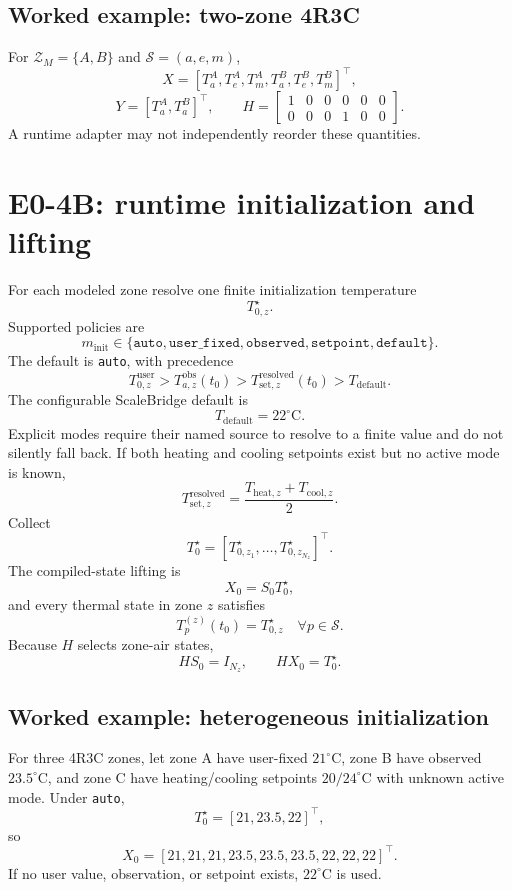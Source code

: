 \documentclass[11pt]{article}
\newcommand{\Zset}{\mathcal{Z}_M}
\begin{document}
\subsection*{Worked example: two-zone 4R3C}
For \(\Zset=\{A,B\}\) and \(\mathcal S=(a,e,m)\),
\[
X=[T_a^A,T_e^A,T_m^A,T_a^B,T_e^B,T_m^B]^\top,
\]
\[
Y=[T_a^A,T_a^B]^\top,\qquad
H=\begin{bmatrix}1&0&0&0&0&0\\0&0&0&1&0&0\end{bmatrix}.
\]
A runtime adapter may not independently reorder these quantities.

\section{E0-4B: runtime initialization and lifting}
For each modeled zone resolve one finite initialization temperature
\[
\boxed{T_{0,z}^{\star}}.
\]
Supported policies are
\[
\boxed{m_{\mathrm{init}}\in\{\texttt{auto},\texttt{user\_fixed},\texttt{observed},\texttt{setpoint},\texttt{default}\}}.
\]
The default is \texttt{auto}, with precedence
\[
\boxed{T_{0,z}^{\mathrm{user}}>T_{a,z}^{\mathrm{obs}}(t_0)>T_{\mathrm{set},z}^{\mathrm{resolved}}(t_0)>T_{\mathrm{default}}}.
\]
The configurable ScaleBridge default is
\[
\boxed{T_{\mathrm{default}}=22^\circ\mathrm C}.
\]
Explicit modes require their named source to resolve to a finite value and do not silently
fall back. If both heating and cooling setpoints exist but no active mode is known,
\[
\boxed{T_{\mathrm{set},z}^{\mathrm{resolved}}=\frac{T_{\mathrm{heat},z}+T_{\mathrm{cool},z}}{2}}.
\]
Collect
\[
T_0^\star=[T_{0,z_1}^{\star},\ldots,T_{0,z_{N_z}}^{\star}]^\top.
\]
The compiled-state lifting is
\[
\boxed{X_0=S_0T_0^\star},
\]
and every thermal state in zone \(z\) satisfies
\[
\boxed{T_p^{(z)}(t_0)=T_{0,z}^{\star}\quad\forall p\in\mathcal S}.
\]
Because \(H\) selects zone-air states,
\[
\boxed{HS_0=I_{N_z}},\qquad
\boxed{HX_0=T_0^\star}.
\]

\subsection*{Worked example: heterogeneous initialization}
For three 4R3C zones, let zone A have user-fixed \(21^\circ\mathrm C\), zone B have observed
\(23.5^\circ\mathrm C\), and zone C have heating/cooling setpoints \(20/24^\circ\mathrm C\)
with unknown active mode. Under \texttt{auto},
\[
T_0^\star=[21,23.5,22]^\top,
\]
so
\[
\boxed{X_0=[21,21,21,23.5,23.5,23.5,22,22,22]^\top}.
\]
If no user value, observation, or setpoint exists, \(22^\circ\mathrm C\) is used.
\end{document}

